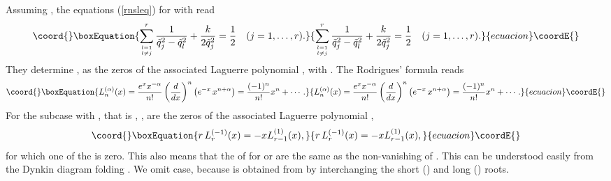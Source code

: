 \documentclass[a4paper,12pt]{article}
\begin{document}
Assuming \coordHE{}, the equations (\ref{rnsleq}) for \coordHE{}
with \coordHE{} read
\begin{equation}\coord{}\boxEquation{
   \sum_{l=1\atop l\ne j}^{r}{1\over{\tilde{q}_j^2-\tilde{q}_l^2}}
   +{k\over{2\tilde{q}_j^2}}={1\over{2}}\quad(j=1,\ldots,r).
   \label{lagroots}
}{
   \sum_{l=1\atop l\ne j}^{r}{1\over{\tilde{q}_j^2-\tilde{q}_l^2}}
   +{k\over{2\tilde{q}_j^2}}={1\over{2}}\quad(j=1,\ldots,r).
   }{ecuacion}\coordE{}\end{equation}
They determine \coordHE{}, as the zeros of the associated Laguerre polynomial
\coordHE{}, with \coordHE{} \cite{cs,szego,OP1}.
The Rodrigues' formula reads
\begin{equation}\coord{}\boxEquation{
   L_n^{(\alpha)}(x)={e^x x^{-\alpha}\over{n!}}\left({d\over{dx}}\right)^n
   \left(e^{-x}\,x^{n+\alpha}\right)=\frac{(-1)^n}{n!}x^n+\cdots.
}{
   L_n^{(\alpha)}(x)={e^x x^{-\alpha}\over{n!}}\left({d\over{dx}}\right)^n
   \left(e^{-x}\,x^{n+\alpha}\right)=\frac{(-1)^n}{n!}x^n+\cdots.
}{ecuacion}\coordE{}\end{equation}
For the subcase with \coordHE{}, that is \coordHE{}, \coordHE{}, are the zeros of the
associated Laguerre  polynomial \cite{szego,OP1},
\begin{equation}\coord{}\boxEquation{
   r\,L_{r}^{(-1)}(x)=-xL_{r-1}^{(1)}(x),
   \label{lagiden}
}{
   r\,L_{r}^{(-1)}(x)=-xL_{r-1}^{(1)}(x),
   }{ecuacion}\coordE{}\end{equation}
for which one of the \coordHE{} is zero.
This also means that the \coordHE{} of \coordHE{} for \coordHE{} or
\coordHE{} are the same as the non-vanishing \coordHE{} of \coordHE{}.
This can be understood easily from the Dynkin diagram folding \coordHE{}.
We omit \coordHE{} case, because \coordHE{} is obtained from \coordHE{} by interchanging the
short (\coordHE{}) and long (\coordHE{}) roots.
\end{document}
